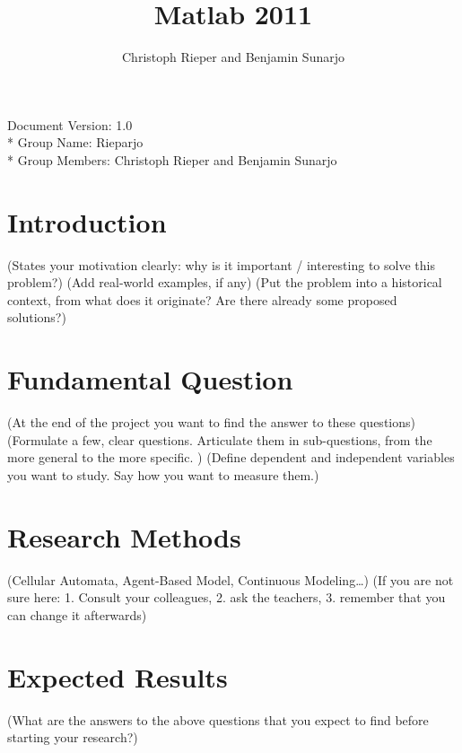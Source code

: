 \documentclass[a4paper, DIV11, abstracton]{scrartcl}
\begin{document}
\title{Matlab 2011}
\author{Christoph Rieper and Benjamin Sunarjo}


\maketitle

Document Version: 1.0\\*
Group Name: Rieparjo\\*
Group Members: Christoph Rieper and Benjamin Sunarjo


\setcounter{page}{1}	%
\section{Introduction}

(States your motivation clearly: why is it important / interesting to solve this problem?)
(Add real-world examples, if any)
(Put the problem into a historical context, from what does it originate? Are there already some proposed solutions?)
\citet{helbing.1997}


\section{Fundamental Question}

(At the end of the project you want to find the answer to these questions)
(Formulate a few, clear questions. Articulate them in sub-questions, from the more general to the more specific. )
(Define dependent and independent variables you want to study. Say how you want to measure them.)


\section{Research Methods}

(Cellular Automata, Agent-Based Model, Continuous Modeling…)
(If you are not sure here: 1. Consult your colleagues, 2. ask the teachers, 3. remember that you can change it afterwards)


\section{Expected Results}

(What are the answers to the above questions that you expect to find before starting your research?)





\end{document}
